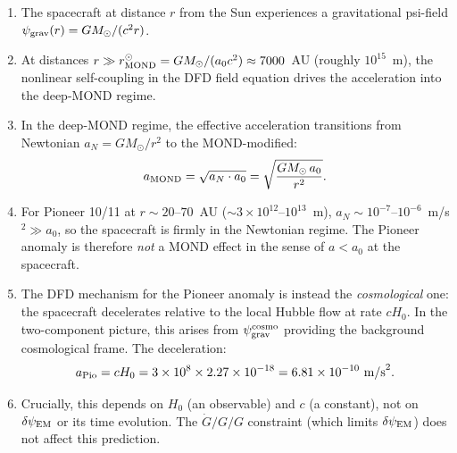 \documentclass[11pt]{article}
\newcommand{\ee}[1]{\times 10^{#1}}
\newcommand{\psigrav}{\psi_{\rm grav}}
\newcommand{\dpsiEM}{\delta\psi_{\rm EM}}
\newcommand{\Hzero}{H_0}
\newcommand{\aM}{a_0}
\newcommand{\Gdot}{\dot{G}/G}
\begin{document}
\begin{enumerate}
\item The spacecraft at distance $r$ from the Sun experiences a gravitational
  psi-field $\psigrav(r) = GM_\odot/(c^2 r)$.

\item At distances $r \gg r_{\rm MOND}^\odot = GM_\odot/(\aM c^2) \approx
  7000$~AU (roughly $10^{15}$~m), the nonlinear self-coupling in the
  DFD field equation drives the acceleration into the deep-MOND regime.

\item In the deep-MOND regime, the effective acceleration transitions from
  Newtonian $a_N = GM_\odot/r^2$ to the MOND-modified:
  \begin{equation}
  a_{\rm MOND} = \sqrt{a_N \cdot \aM} = \sqrt{\frac{GM_\odot\,\aM}{r^2}}.
  \end{equation}

\item For Pioneer 10/11 at $r \sim 20$--$70$~AU ($\sim 3\ee{12}$--$10^{13}$~m),
  $a_N \sim 10^{-7}$--$10^{-6}$~m/s$^2 \gg \aM$, so the spacecraft is
  firmly in the Newtonian regime. The Pioneer anomaly is therefore
  \emph{not} a MOND effect in the sense of $a < \aM$ at the spacecraft.

\item The DFD mechanism for the Pioneer anomaly is instead the
  \emph{cosmological} one: the spacecraft decelerates relative to the
  local Hubble flow at rate $c\Hzero$. In the two-component picture,
  this arises from $\psigrav^{\rm cosmo}$ providing the background
  cosmological frame. The deceleration:
  \begin{equation}
  a_{\rm Pio} = c\Hzero = 3\ee{8}\times 2.27\ee{-18} = 6.81\ee{-10}~\text{m/s}^2.
  \label{eq:a-Pio}
  \end{equation}

\item Crucially, this depends on $\Hzero$ (an observable) and $c$
  (a constant), not on $\dpsiEM$ or its time evolution. The $\Gdot/G$
  constraint (which limits $\dpsiEM$) does not affect this prediction.
\end{enumerate}
\end{document}
